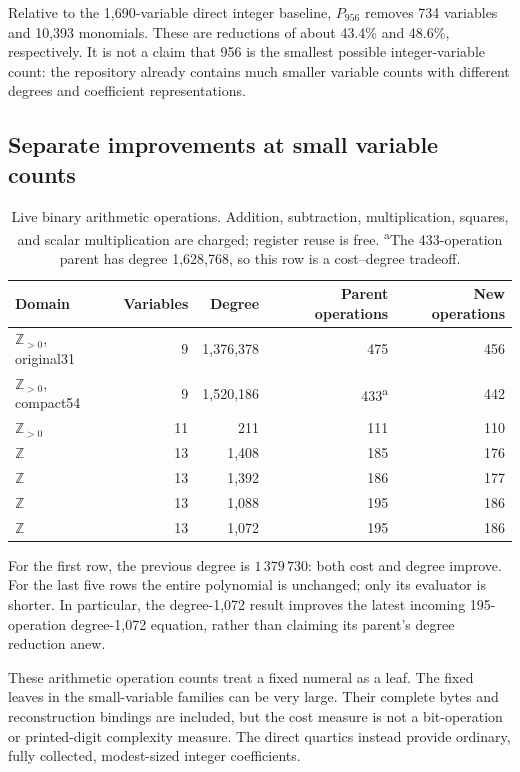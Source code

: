 \documentclass[11pt,letterpaper]{article}
\theoremstyle{definition}
\theoremstyle{remark}
\newcommand{\Z}{\mathbb Z}
\begin{document}
Relative to the 1,690-variable direct integer baseline, $P_{956}$ removes
734 variables and 10,393 monomials. These are reductions of about
43.4\% and 48.6\%, respectively. It is not a claim that 956 is the
smallest possible integer-variable count: the repository already contains
much smaller variable counts with different degrees and coefficient
representations.

\subsection{Separate improvements at small variable counts}

\begin{table}[htbp]
\centering\small
\begin{tabular}{@{}lrrrr@{}}
\toprule
Domain & Variables & Degree & Parent operations & New operations\\
\midrule
$\Z_{>0}$, original31 & 9 & 1,376,378 & 475 & 456\\
$\Z_{>0}$, compact54 & 9 & 1,520,186 & 433\textsuperscript{a} & 442\\
$\Z_{>0}$ & 11 & 211 & 111 & 110\\
$\Z$ & 13 & 1,408 & 185 & 176\\
$\Z$ & 13 & 1,392 & 186 & 177\\
$\Z$ & 13 & 1,088 & 195 & 186\\
$\Z$ & 13 & 1,072 & 195 & 186\\
\bottomrule
\end{tabular}
\caption{Live binary arithmetic operations. Addition, subtraction,
multiplication, squares, and scalar multiplication are charged; register
reuse is free. \textsuperscript{a}The 433-operation parent has degree
1,628,768, so this row is a cost--degree tradeoff.}
\label{tab:small}
\end{table}

For the first row, the previous degree is $1\,379\,730$: both cost and
degree improve. For the last five rows the entire polynomial is unchanged;
only its evaluator is shorter. In particular, the degree-1,072 result
improves the latest incoming 195-operation degree-1,072 equation, rather
than claiming its parent's degree reduction anew.

These arithmetic operation counts treat a fixed numeral as a leaf.
The fixed leaves in the small-variable families can be very large.
Their complete bytes and reconstruction bindings are included, but the
cost measure is not a bit-operation or printed-digit complexity measure.
The direct quartics instead provide ordinary, fully collected, modest-sized
integer coefficients.
\end{document}
